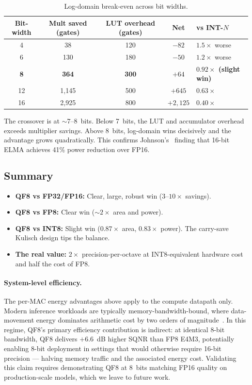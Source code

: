 \documentclass[11pt,letterpaper]{article}
\theoremstyle{definition}
\theoremstyle{remark}
\begin{document}
\begin{table}[ht]
\centering
\caption{Log-domain break-even across bit widths.}
\label{tab:breakeven}
\begin{tabular}{@{}ccccl@{}}
\toprule
Bit-width & Mult saved (gates) & LUT overhead (gates) & Net & vs INT-$N$ \\
\midrule
4   & 38     & 120  & $-82$     & $1.5\times$ worse \\
6   & 130    & 180  & $-50$     & $1.2\times$ worse \\
\textbf{8}   & \textbf{364}    & \textbf{300}  & $+64$     & \textbf{$0.92\times$ (slight win)} \\
12  & 1,145  & 500  & $+645$    & $0.63\times$ \\
16  & 2,925  & 800  & $+2{,}125$& $0.40\times$ \\
\bottomrule
\end{tabular}
\end{table}

The crossover is at ${\sim}7$--$8$~bits.
Below 7~bits, the LUT and accumulator overhead exceeds multiplier savings.
Above 8~bits, log-domain wins decisively and the advantage grows quadratically.
This confirms Johnson's~\cite{johnson2018} finding that 16-bit ELMA achieves 41\% power
reduction over FP16.

\subsection{Summary}

\begin{itemize}[leftmargin=2em]
  \item \textbf{QF8 vs FP32/FP16:} Clear, large, robust win
    ($3$--$10\times$ savings).
  \item \textbf{QF8 vs FP8:} Clear win (${\sim}2\times$ area and power).
  \item \textbf{QF8 vs INT8:} Slight win ($0.87\times$ area,
    $0.83\times$ power).
    The carry-save Kulisch design tips the balance.
  \item \textbf{The real value:} $2\times$ precision-per-octave at
    INT8-equivalent hardware cost and half the cost of FP8.
\end{itemize}

\paragraph{System-level efficiency.}
The per-MAC energy advantages above apply to the compute datapath only.
Modern inference workloads are typically memory-bandwidth-bound, where
data-movement energy dominates arithmetic cost by two orders of
magnitude~\cite{horowitz2014}.
In this regime, QF8's primary efficiency contribution is indirect: at identical
8-bit bandwidth, QF8 delivers $+6.6$~dB higher SQNR than FP8 E4M3, potentially
enabling 8-bit deployment in settings that would otherwise require 16-bit
precision --- halving memory traffic and the associated energy cost.
Validating this claim requires demonstrating QF8 at 8~bits matching FP16 quality
on production-scale models, which we leave to future work.
\end{document}
